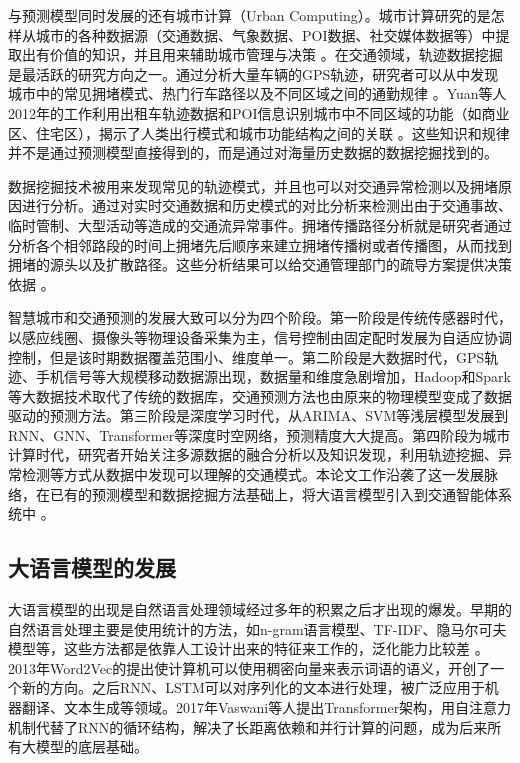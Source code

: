 与预测模型同时发展的还有城市计算（Urban Computing）。城市计算研究的是怎样从城市的各种数据源（交通数据、气象数据、POI数据、社交媒体数据等）中提取出有价值的知识，并且用来辅助城市管理与决策 。在交通领域，轨迹数据挖掘是最活跃的研究方向之一。通过分析大量车辆的GPS轨迹，研究者可以从中发现城市中的常见拥堵模式、热门行车路径以及不同区域之间的通勤规律 。Yuan等人2012年的工作利用出租车轨迹数据和POI信息识别城市中不同区域的功能（如商业区、住宅区），揭示了人类出行模式和城市功能结构之间的关联 。这些知识和规律并不是通过预测模型直接得到的，而是通过对海量历史数据的数据挖掘找到的。

数据挖掘技术被用来发现常见的轨迹模式，并且也可以对交通异常检测以及拥堵原因进行分析。通过对实时交通数据和历史模式的对比分析来检测出由于交通事故、临时管制、大型活动等造成的交通流异常事件。拥堵传播路径分析就是研究者通过分析各个相邻路段的时间上拥堵先后顺序来建立拥堵传播树或者传播图，从而找到拥堵的源头以及扩散路径。这些分析结果可以给交通管理部门的疏导方案提供决策依据 。

智慧城市和交通预测的发展大致可以分为四个阶段。第一阶段是传统传感器时代，以感应线圈、摄像头等物理设备采集为主，信号控制由固定配时发展为自适应协调控制，但是该时期数据覆盖范围小、维度单一。第二阶段是大数据时代，GPS轨迹、手机信号等大规模移动数据源出现，数据量和维度急剧增加，Hadoop和Spark等大数据技术取代了传统的数据库，交通预测方法也由原来的物理模型变成了数据驱动的预测方法。第三阶段是深度学习时代，从ARIMA、SVM等浅层模型发展到RNN、GNN、Transformer等深度时空网络，预测精度大大提高。第四阶段为城市计算时代，研究者开始关注多源数据的融合分析以及知识发现，利用轨迹挖掘、异常检测等方式从数据中发现可以理解的交通模式。本论文工作沿袭了这一发展脉络，在已有的预测模型和数据挖掘方法基础上，将大语言模型引入到交通智能体系统中 。

\subsection{大语言模型的发展}

大语言模型的出现是自然语言处理领域经过多年的积累之后才出现的爆发。早期的自然语言处理主要是使用统计的方法，如n-gram语言模型、TF-IDF、隐马尔可夫模型等，这些方法都是依靠人工设计出来的特征来工作的，泛化能力比较差 。2013年Word2Vec的提出使计算机可以使用稠密向量来表示词语的语义，开创了一个新的方向。之后RNN、LSTM可以对序列化的文本进行处理，被广泛应用于机器翻译、文本生成等领域。2017年Vaswani等人提出Transformer架构，用自注意力机制代替了RNN的循环结构，解决了长距离依赖和并行计算的问题，成为后来所有大模型的底层基础。

